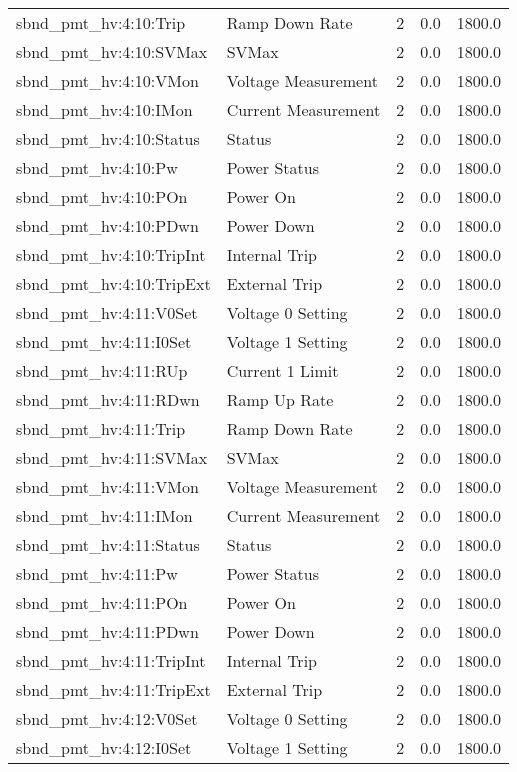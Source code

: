 \begin{center}
\begin{longtable}{l | l l l l }
sbnd\_pmt\_hv:4:10:Trip & Ramp Down Rate & 2 & 0.0 & 1800.0\\ 
sbnd\_pmt\_hv:4:10:SVMax & SVMax & 2 & 0.0 & 1800.0\\ 
sbnd\_pmt\_hv:4:10:VMon & Voltage Measurement & 2 & 0.0 & 1800.0\\ 
sbnd\_pmt\_hv:4:10:IMon & Current Measurement & 2 & 0.0 & 1800.0\\ 
sbnd\_pmt\_hv:4:10:Status & Status & 2 & 0.0 & 1800.0\\ 
sbnd\_pmt\_hv:4:10:Pw & Power Status & 2 & 0.0 & 1800.0\\ 
sbnd\_pmt\_hv:4:10:POn & Power On & 2 & 0.0 & 1800.0\\ 
sbnd\_pmt\_hv:4:10:PDwn & Power Down & 2 & 0.0 & 1800.0\\ 
sbnd\_pmt\_hv:4:10:TripInt & Internal Trip & 2 & 0.0 & 1800.0\\ 
sbnd\_pmt\_hv:4:10:TripExt & External Trip & 2 & 0.0 & 1800.0\\ 
sbnd\_pmt\_hv:4:11:V0Set & Voltage 0 Setting & 2 & 0.0 & 1800.0\\ 
sbnd\_pmt\_hv:4:11:I0Set & Voltage 1 Setting & 2 & 0.0 & 1800.0\\ 
sbnd\_pmt\_hv:4:11:RUp & Current 1 Limit & 2 & 0.0 & 1800.0\\ 
sbnd\_pmt\_hv:4:11:RDwn & Ramp Up Rate & 2 & 0.0 & 1800.0\\ 
sbnd\_pmt\_hv:4:11:Trip & Ramp Down Rate & 2 & 0.0 & 1800.0\\ 
sbnd\_pmt\_hv:4:11:SVMax & SVMax & 2 & 0.0 & 1800.0\\ 
sbnd\_pmt\_hv:4:11:VMon & Voltage Measurement & 2 & 0.0 & 1800.0\\ 
sbnd\_pmt\_hv:4:11:IMon & Current Measurement & 2 & 0.0 & 1800.0\\ 
sbnd\_pmt\_hv:4:11:Status & Status & 2 & 0.0 & 1800.0\\ 
sbnd\_pmt\_hv:4:11:Pw & Power Status & 2 & 0.0 & 1800.0\\ 
sbnd\_pmt\_hv:4:11:POn & Power On & 2 & 0.0 & 1800.0\\ 
sbnd\_pmt\_hv:4:11:PDwn & Power Down & 2 & 0.0 & 1800.0\\ 
sbnd\_pmt\_hv:4:11:TripInt & Internal Trip & 2 & 0.0 & 1800.0\\ 
sbnd\_pmt\_hv:4:11:TripExt & External Trip & 2 & 0.0 & 1800.0\\ 
sbnd\_pmt\_hv:4:12:V0Set & Voltage 0 Setting & 2 & 0.0 & 1800.0\\ 
sbnd\_pmt\_hv:4:12:I0Set & Voltage 1 Setting & 2 & 0.0 & 1800.0\\ 

\end{longtable}
\end{center}
